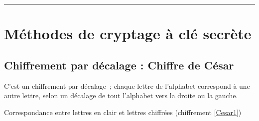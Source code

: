 
\newcommand{\numTD}{TD4}
\newcommand{\themeTD}{Sécurité et Cryptographie}



\hrule

\noindent{}


\section{Méthodes de cryptage à clé secrète}

\subsection{Chiffrement par décalage : Chiffre de César}

C'est un chiffrement par décalage ; chaque lettre de l’alphabet correspond à une autre lettre, selon un décalage de tout l'alphabet vers la droite ou la gauche.

\begin{table}[h]
\begin{tiny}

\end{tiny}
\caption{\label{Cesar1}Correspondance entre lettres en clair et lettres chiffrées (chiffrement \ref{Cesar1})}
\end{table}

